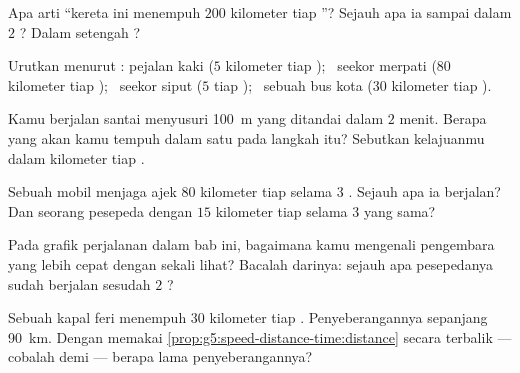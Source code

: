 \begin{exercise}[$\star$]\label{exo:g5:speed-distance-time:4}
Apa arti ``kereta ini menempuh $200$ kilometer tiap ''? Sejauh apa
ia sampai dalam $2$ ? Dalam setengah ?
\end{exercise}

\begin{exercise}[$\star$]\label{exo:g5:speed-distance-time:5}
Urutkan menurut : pejalan kaki ($5$ kilometer tiap );
\ seekor merpati ($80$ kilometer tiap ); \ seekor siput ($5$
\emph{} tiap ); \ sebuah bus kota ($30$ kilometer tiap ).
\end{exercise}

\begin{exercise}[$\star$]\label{exo:g5:speed-distance-time:6}
Kamu berjalan santai menyusuri \qty{100}{m} yang ditandai dalam $2$
menit. Berapa  yang akan kamu tempuh dalam satu  pada langkah
itu? Sebutkan kelajuanmu dalam kilometer tiap .
\end{exercise}

\begin{exercise}[$\star$]\label{exo:g5:speed-distance-time:7}
Sebuah mobil menjaga  ajek $80$ kilometer tiap  selama $3$
. Sejauh apa ia berjalan? Dan seorang pesepeda dengan $15$
kilometer tiap  selama $3$  yang sama?
\end{exercise}

\begin{exercise}[$\star$]\label{exo:g5:speed-distance-time:8}
Pada grafik perjalanan dalam bab ini, bagaimana kamu mengenali
pengembara yang lebih cepat dengan sekali lihat? Bacalah darinya:
sejauh apa pesepedanya sudah berjalan sesudah $2$ ?
\end{exercise}

\begin{exercise}[$\star\star$]\label{exo:g5:speed-distance-time:9}
Sebuah kapal feri menempuh $30$ kilometer tiap . Penyeberangannya
sepanjang \qty{90}{km}. Dengan memakai
\cref{prop:g5:speed-distance-time:distance} secara terbalik ---
cobalah  demi  --- berapa lama penyeberangannya?
\end{exercise}

